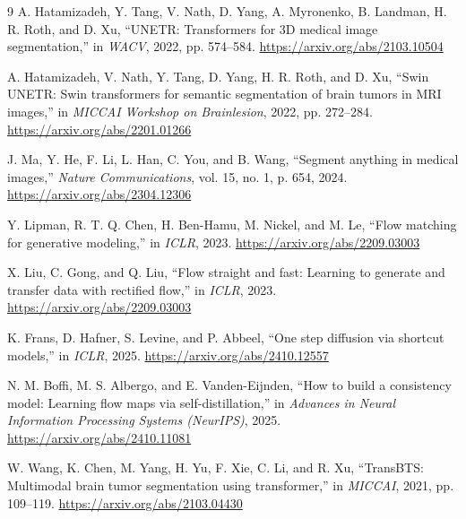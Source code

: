 \documentclass[10.1005,journal]{IEEEtran}
\begin{document}
\begin{thebibliography}{9}
A. Hatamizadeh, Y. Tang, V. Nath, D. Yang, A. Myronenko, B. Landman, H. R. Roth, and D. Xu, ``UNETR: Transformers for 3D medical image segmentation,'' in \emph{WACV}, 2022, pp. 574--584. \url{https://arxiv.org/abs/2103.10504}

A. Hatamizadeh, V. Nath, Y. Tang, D. Yang, H. R. Roth, and D. Xu, ``Swin UNETR: Swin transformers for semantic segmentation of brain tumors in MRI images,'' in \emph{MICCAI Workshop on Brainlesion}, 2022, pp. 272--284. \url{https://arxiv.org/abs/2201.01266}

J. Ma, Y. He, F. Li, L. Han, C. You, and B. Wang, ``Segment anything in medical images,'' \emph{Nature Communications}, vol. 15, no. 1, p. 654, 2024. \url{https://arxiv.org/abs/2304.12306}

Y. Lipman, R. T. Q. Chen, H. Ben-Hamu, M. Nickel, and M. Le, ``Flow matching for generative modeling,'' in \emph{ICLR}, 2023. \url{https://arxiv.org/abs/2209.03003}

X. Liu, C. Gong, and Q. Liu, ``Flow straight and fast: Learning to generate and transfer data with rectified flow,'' in \emph{ICLR}, 2023. \url{https://arxiv.org/abs/2209.03003}

K. Frans, D. Hafner, S. Levine, and P. Abbeel, ``One step diffusion via shortcut models,'' in \emph{ICLR}, 2025. \url{https://arxiv.org/abs/2410.12557}

N. M. Boffi, M. S. Albergo, and E. Vanden-Eijnden, ``How to build a consistency model: Learning flow maps via self-distillation,'' in \emph{Advances in Neural Information Processing Systems (NeurIPS)}, 2025. \url{https://arxiv.org/abs/2410.11081}

W. Wang, K. Chen, M. Yang, H. Yu, F. Xie, C. Li, and R. Xu, ``TransBTS: Multimodal brain tumor segmentation using transformer,'' in \emph{MICCAI}, 2021, pp. 109--119. \url{https://arxiv.org/abs/2103.04430}
\end{thebibliography}
\end{document}
